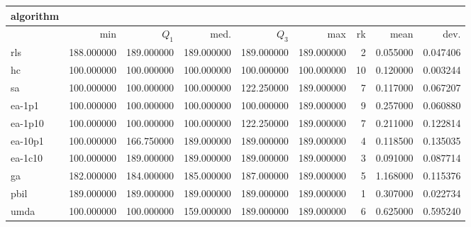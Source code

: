 \begin{tabular}{@{}l*{5}{>{{}}N{3}{0}}>{{}}N{2}{0}N{1}{3}N{1}{3}@{}}
\toprule
{algorithm} &  &  \\
\midrule
& {min} & {$Q_1$} & {med.} & {$Q_3$} & {max} & {rk} & {mean} & {dev.} \\
\midrule
rls & 188.000000 & {\color{blue}} 189.000000 & {\color{blue}} 189.000000 & {\color{blue}} 189.000000 & {\color{blue}} 189.000000 & 2 & 0.055000 & 0.047406 \\
 hc & 100.000000 & 100.000000 & 100.000000 & 100.000000 & 100.000000 & 10 & 0.120000 & 0.003244 \\
 sa & 100.000000 & 100.000000 & 100.000000 & 122.250000 & {\color{blue}} 189.000000 & 7 & 0.117000 & 0.067207 \\
 ea-1p1 & 100.000000 & 100.000000 & 100.000000 & 100.000000 & {\color{blue}} 189.000000 & 9 & 0.257000 & 0.060880 \\
 ea-1p10 & 100.000000 & 100.000000 & 100.000000 & 122.250000 & {\color{blue}} 189.000000 & 7 & 0.211000 & 0.122814 \\
 ea-10p1 & 100.000000 & 166.750000 & {\color{blue}} 189.000000 & {\color{blue}} 189.000000 & {\color{blue}} 189.000000 & 4 & 0.118500 & 0.135035 \\
 ea-1c10 & 100.000000 & {\color{blue}} 189.000000 & {\color{blue}} 189.000000 & {\color{blue}} 189.000000 & {\color{blue}} 189.000000 & 3 & 0.091000 & 0.087714 \\
 ga & 182.000000 & 184.000000 & 185.000000 & 187.000000 & {\color{blue}} 189.000000 & 5 & 1.168000 & 0.115376 \\
 pbil & {\color{blue}} 189.000000 & {\color{blue}} 189.000000 & {\color{blue}} 189.000000 & {\color{blue}} 189.000000 & {\color{blue}} 189.000000 & 1 & 0.307000 & 0.022734 \\
 umda & 100.000000 & 100.000000 & 159.000000 & {\color{blue}} 189.000000 & {\color{blue}} 189.000000 & 6 & 0.625000 & 0.595240 \\
 \bottomrule
\end{tabular}

